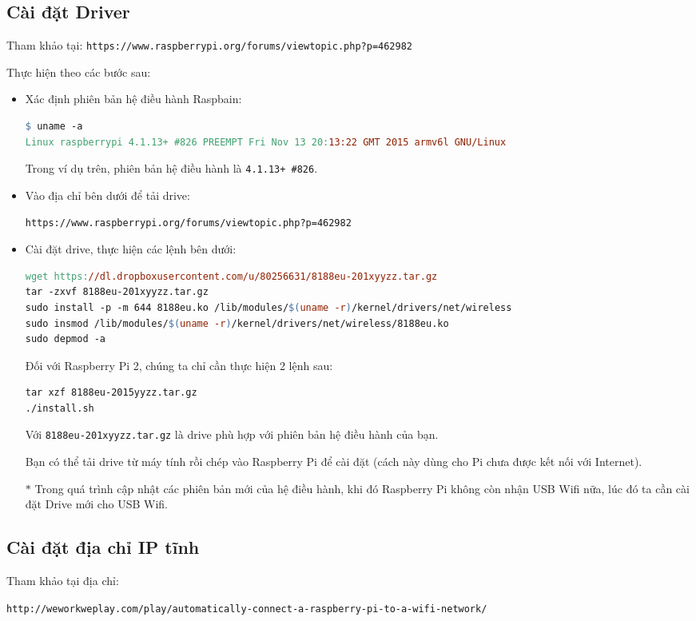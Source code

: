 \subsection{Cài đặt Driver}
Tham khảo tại: \verb|https://www.raspberrypi.org/forums/viewtopic.php?p=462982|

Thực hiện theo các bước sau:
\begin{itemize}
\item Xác định phiên bản hệ điều hành Raspbain:
\begin{lstlisting}[language=make]
$ uname -a
Linux raspberrypi 4.1.13+ #826 PREEMPT Fri Nov 13 20:13:22 GMT 2015 armv6l GNU/Linux
\end{lstlisting}
Trong ví dụ trên, phiên bản hệ điều hành là \verb|4.1.13+ #826|. 
\item Vào địa chỉ bên dưới để tải drive:

\verb|https://www.raspberrypi.org/forums/viewtopic.php?p=462982|
\item Cài đặt drive, thực hiện các lệnh bên dưới:
\begin{lstlisting}[language=make]
wget https://dl.dropboxusercontent.com/u/80256631/8188eu-201xyyzz.tar.gz
tar -zxvf 8188eu-201xyyzz.tar.gz
sudo install -p -m 644 8188eu.ko /lib/modules/$(uname -r)/kernel/drivers/net/wireless
sudo insmod /lib/modules/$(uname -r)/kernel/drivers/net/wireless/8188eu.ko
sudo depmod -a
\end{lstlisting}
Đối với Raspberry Pi 2, chúng ta chỉ cần thực hiện 2 lệnh sau:
\begin{lstlisting}[language=make]
tar xzf 8188eu-2015yyzz.tar.gz
./install.sh
\end{lstlisting}
Với \verb|8188eu-201xyyzz.tar.gz| là drive phù hợp với phiên bản hệ điều hành của bạn.

Bạn có thể tải drive từ máy tính rồi chép vào Raspberry Pi để cài đặt (cách này dùng cho Pi chưa được kết nối với Internet).
\item[$\ast$] Trong quá trình cập nhật các phiên bản mới của hệ điều hành, khi đó Raspberry Pi không còn nhận USB Wifi nữa, lúc đó ta cần cài đặt Drive mới cho USB Wifi.
\end{itemize}
\subsection{Cài đặt địa chỉ IP tĩnh}
Tham khảo tại địa chỉ: 

\begin{footnotesize}
\verb|http://weworkweplay.com/play/automatically-connect-a-raspberry-pi-to-a-wifi-network/|
\end{footnotesize}\\

